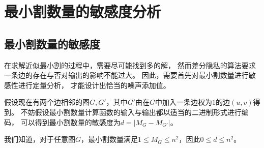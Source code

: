 \chapter{最小割数量的敏感度分析}
\section{最小割数量的敏感度}
在求解近似最小割的过程中，需要尽可能找到多的解，
然而差分隐私的算法要求一条边的存在与否对输出的影响不能过大。
因此，需要首先对最小割数量进行敏感性进行定量分析，
才能设计出恰当的噪声添加值。

假设现在有两个边相邻的图$G,G'$，其中$G'$由在$G$中加入一条边权为$1$的边$(u,v)$得到。
不妨假设最小割数量计算函数的输入与输出都以适当的二进制形式进行编码，
可以得到最小割数量的敏感度为$d=|M_G-M_{G'}|$。

我们知道，对于任意图$G$，最小割数量满足$1\leq M_G\leq n^2$，因此$0\leq d\leq n^2$。



